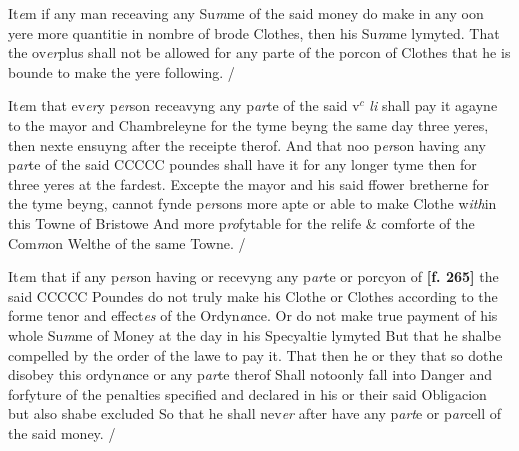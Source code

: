 \documentclass[a4paper,12pt]{article}
\begin{document}
It\textit{e}m if any man receaving any Su\textit{m}me of the said money do make in any oon yere more quantitie in nombre of brode Clothes, then his Su\textit{m}me lymyted. That the ov\textit{er}plus shall not be allowed for any parte of the porcon of Clothes that he is bounde to make the yere following. /

It\textit{e}m that ev\textit{er}y p\textit{er}son receavyng any p\textit{ar}te of the said v$^{c}$ \textit{li} shall pay it agayne to the mayor and Chambreleyne for the tyme beyng the same day three yeres, then nexte ensuyng after the receipte therof. And that noo p\textit{er}son having any p\textit{ar}te of the said CCCCC poundes shall have it for any longer tyme then for three yeres at the fardest. Excepte the mayor and his said ffower bretherne for the tyme beyng, cannot fynde p\textit{er}sons more apte or able to make Clothe w\textit{ith}in this Towne of Bristowe And more p\textit{ro}fytable for the relife \& comforte of the Com\textit{m}on Welthe of the same Towne. /

It\textit{e}m that if any p\textit{er}son having or recevyng any p\textit{ar}te or porcyon of \textbf{[f. 265]} the said CCCCC Poundes do not truly make his Clothe or Clothes according to the forme tenor and effect\textit{es} of the Ordyn\textit{a}nce. Or do not make true payment of his whole Su\textit{m}me of Money at the day in his Specyaltie lymyted But that he shalbe compelled by the order of the lawe to pay it. That then he or they that so dothe disobey this ordyn\textit{a}nce or any p\textit{ar}te therof Shall notoonly fall into Danger and forfyture of the penalties specified and declared in his or their said Obligacion but also shabe excluded So that he shall nev\textit{er} after have any p\textit{art}e or p\textit{ar}cell of the said money. /
\end{document}
